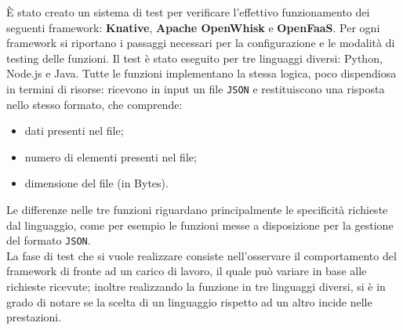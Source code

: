 \documentclass[12pt,a4paper,openany,twoside]{book}
\begin{document}
È stato creato un sistema di test per verificare l'effettivo funzionamento dei seguenti framework: \textbf{Knative}, \textbf{Apache OpenWhisk} e \textbf{OpenFaaS}. Per ogni framework si riportano i passaggi necessari per la configurazione e le modalità di testing delle funzioni.
Il test è stato eseguito per tre linguaggi diversi: Python, Node.js e Java. Tutte le funzioni implementano la stessa logica, poco dispendiosa in termini di risorse: ricevono in input un file \texttt{JSON} e restituiscono una risposta nello stesso formato, che comprende:
\begin{itemize}
    \item dati presenti nel file;
    
    \item numero di elementi presenti nel file;
    
    \item dimensione del file (in Bytes).
\end{itemize}
Le differenze nelle tre funzioni riguardano principalmente le specificità richieste dal linguaggio, come per esempio le funzioni messe a disposizione per la gestione del formato \texttt{JSON}.
\\
La fase di test che si vuole realizzare consiste nell'osservare il comportamento del framework di fronte ad un carico di lavoro, il quale può variare in base alle richieste ricevute; inoltre realizzando la funzione in tre linguaggi diversi, si è in grado di notare se la scelta di un linguaggio rispetto ad un altro incide nelle prestazioni.
\end{document}
